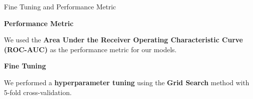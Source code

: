 \begin{frame}{Fine Tuning and Performance Metric}

    \textbf{Performance Metric}

    We used the \textbf{Area Under the Receiver Operating Characteristic Curve (ROC-AUC)} as the performance metric for our models.
    
    \textbf{Fine Tuning}

    We performed a \textbf{hyperparameter tuning} using the \textbf{Grid Search} method with 5-fold cross-validation.

    \begin{adjustbox}{margin=-0.5em 0em}
    \begin{columns}[T,totalwidth=\textwidth]
        \begin{column}{0.29\textwidth}

\end{column}
\end{columns}
\end{adjustbox}
\end{frame}
